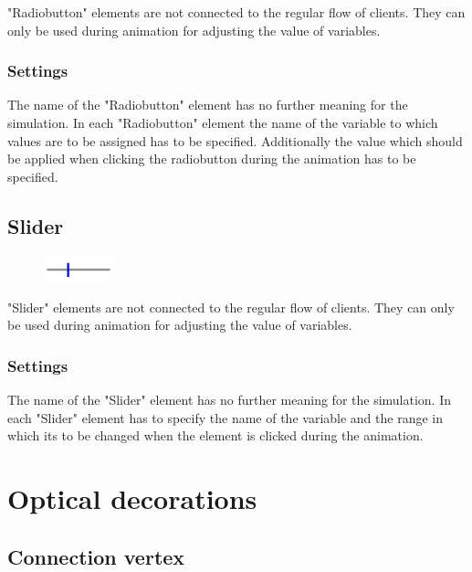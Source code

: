 "Radiobutton" elements are not connected to the regular flow of clients.
They can only be used during animation for adjusting the value of
variables.

\subsection*{Settings}

The name of the "Radiobutton" element has no further meaning for the simulation.
In each "Radiobutton" element the name of the variable to which values are to
be assigned has to be specified. Additionally the value which should be
applied when clicking the radiobutton during the animation has to be specified.  


\section{Slider}
\label{ref:ModelElementInteractiveSlider}

\begin{figure}
\vspace{-22pt}
\includegraphics[width=2cm]{imageModelElementInteractiveSlider.png}
\vspace{-22pt}
\end{figure}

"Slider" elements are not connected to the regular flow of clients.
They can only be used during animation for adjusting the value of
variables.

\subsection*{Settings}

The name of the "Slider" element has no further meaning for the simulation.
In each "Slider" element has to specify the name of the variable and the
range in which its to be changed when the element is clicked during the
animation.





\chapter{Optical decorations}

\section{Connection vertex}
\label{ref:ModelElementVertex}

